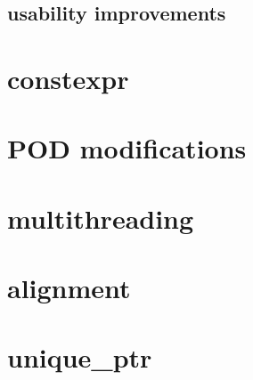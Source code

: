 \documentclass{beamer}
\begin{document}
\subsection{usability improvements}


\section{constexpr}
\section{POD modifications}
\section{multithreading}
\section{alignment}
\section{unique\_ptr}
\end{document}
